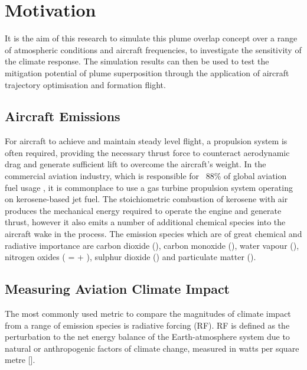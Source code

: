 \section{Motivation}
It is the aim of this research to simulate this plume overlap concept over a range of atmospheric conditions and aircraft frequencies, to investigate the sensitivity of the climate response. The simulation results can then be used to test the mitigation potential of plume superposition through the application of aircraft trajectory optimisation and formation flight.

\subsection{Aircraft Emissions}
For aircraft to achieve and maintain steady level flight, a propulsion system is often required, providing the necessary thrust force to counteract aerodynamic drag and generate sufficient lift to overcome the aircraft's weight. In the commercial aviation industry, which is responsible for ~88\% of global aviation fuel usage \cite{Gossling2020}, it is commonplace to use a gas turbine propulsion system operating on kerosene-based jet fuel. The stoichiometric combustion of kerosene with air produces the mechanical energy required to operate the engine and generate thrust, however it also emits a number of additional chemical species into the aircraft wake in the process. The emission species which are of great chemical and radiative importance are carbon dioxide (), carbon monoxide (), water vapour (), nitrogen oxides ( =  + ), sulphur dioxide () and particulate matter (). 

\subsection{Measuring Aviation Climate Impact}
The most commonly used metric to compare the magnitudes of climate impact from a range of emission species is radiative forcing (RF). RF is defined as the perturbation to the net energy balance of the Earth-atmosphere system due to natural or anthropogenic factors of climate change, measured in watts per square metre [].


